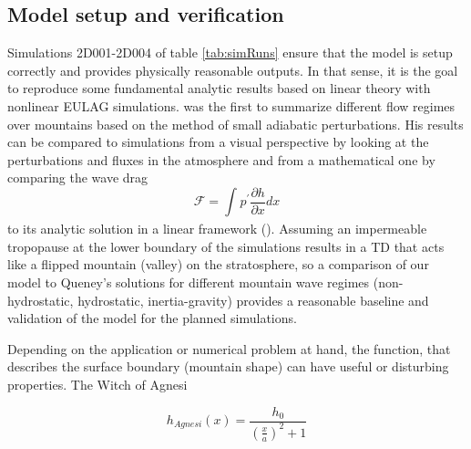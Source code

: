 \subsection{Model setup and verification}
\label{sec:modelVerification}


Simulations 2D001-2D004 of table \ref{tab:simRuns} ensure that the model is setup correctly and provides physically reasonable outputs. In that sense, it is the goal to reproduce some fundamental analytic results based on linear theory with nonlinear EULAG simulations. \textcite{queney_problem_1948} was the first to summarize different flow regimes over mountains based on the method of small adiabatic perturbations. His results can be compared to simulations from a visual perspective by looking at the perturbations and fluxes in the atmosphere and from a mathematical one by comparing the wave drag
%
\begin{equation}
    \mathcal{F} = \int_{}^{} p^{'} \frac{\partial h}{\partial x} dx
    \label{equ:waveDrag}
\end{equation}
%
to its analytic solution in a linear framework (\cite{gill_atmosphere-ocean_1982}). Assuming an impermeable tropopause at the lower boundary of the simulations results in a TD that acts like a flipped mountain (valley) on the stratosphere, so a comparison of our model to Queney's solutions for different mountain wave regimes (non-hydrostatic, hydrostatic, inertia-gravity) provides a reasonable baseline and validation of the model for the planned simulations.

Depending on the application or numerical problem at hand, the function, that describes the surface boundary (mountain shape) can have useful or disturbing properties. The Witch of Agnesi

\begin{equation}
    h_{Agnesi}(x) = \frac{h_0}{(\frac{x}{a})^2+1}
    \label{equ:witchOfAgnesi}
\end{equation}

